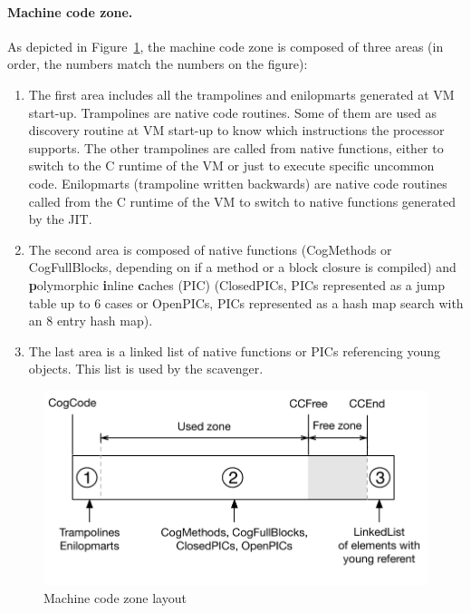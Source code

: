 \documentclass[10pt,nonatbib]{sigplanconf}
\newcommand{\figref}[1]{Figure~\ref{fig:#1}}
\begin{document}
\paragraph{Machine code zone.} As depicted in \figref{CogMemory}, the machine code zone is composed of three areas (in order, the numbers match the numbers on the figure):
\begin{enumerate}
	\item The first area includes all the trampolines and enilopmarts generated at VM start-up. Trampolines are native code routines. Some of them are used as discovery routine at VM start-up to know which instructions the processor supports. The other trampolines are called from native functions, either to switch to the C runtime of the VM or just to execute specific uncommon code. Enilopmarts (trampoline written backwards) are native code routines called from the C runtime of the VM to switch to native functions generated by the JIT. 
	\item The second area is composed of native functions (CogMethods or CogFullBlocks, depending on if a method or a block closure is compiled) and \textbf{p}olymorphic \textbf{i}nline \textbf{c}aches (PIC) (ClosedPICs, PICs represented as a jump table up to 6 cases or OpenPICs, PICs represented as a hash map search with an 8 entry hash map).~\cite{Holz91a}
	\item The last area is a linked list of native functions or PICs referencing young objects. This list is used by the scavenger.
\end{enumerate}

\begin{figure}[htp!]
     \begin{center}
         \includegraphics[width=\linewidth]{CogMemory}
         \caption{Machine code zone layout}
         \label{fig:CogMemory}
     \end{center}
 \end{figure}
\end{document}
